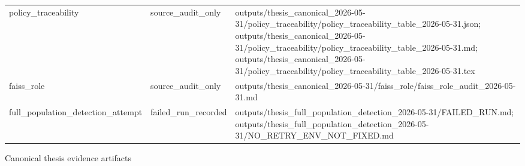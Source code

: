 \begin{tabular}{lll}
policy\_traceability & source\_audit\_only & outputs/thesis\_canonical\_2026-05-31/policy\_traceability/policy\_traceability\_table\_2026-05-31.json; outputs/thesis\_canonical\_2026-05-31/policy\_traceability/policy\_traceability\_table\_2026-05-31.md; outputs/thesis\_canonical\_2026-05-31/policy\_traceability/policy\_traceability\_table\_2026-05-31.tex \\
faiss\_role & source\_audit\_only & outputs/thesis\_canonical\_2026-05-31/faiss\_role/faiss\_role\_audit\_2026-05-31.md \\
full\_population\_detection\_attempt & failed\_run\_recorded & outputs/thesis\_full\_population\_detection\_2026-05-31/FAILED\_RUN.md; outputs/thesis\_full\_population\_detection\_2026-05-31/NO\_RETRY\_ENV\_NOT\_FIXED.md \\
\hline
\end{tabular}
\caption{Canonical thesis evidence artifacts}
